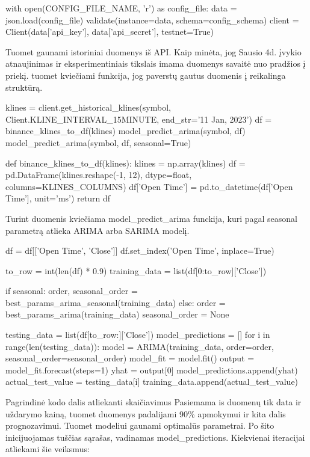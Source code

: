 \documentclass{VUMIFInfKursinis}
\begin{document}
\begin{python}
  with open(CONFIG_FILE_NAME, 'r') as config_file:
  	data = json.load(config_file)
  	validate(instance=data, schema=config_schema)
  	client = Client(data['api_key'], data['api_secret'], testnet=True)
\end{python}

Tuomet gaunami istoriniai duomenys iš API. Kaip minėta, jog Sausio 4d. įvykio atnaujinimas ir eksperimentiniais tikslais imama duomenys savaitė nuo pradžios į priekį.
tuomet kviečiami funkcija, jog paverstų gautus duomenis į reikalinga struktūrą.

\begin{python}
  klines = client.get_historical_klines(symbol, Client.KLINE_INTERVAL_15MINUTE, end_str='11 Jan, 2023')
  df = binance_klines_to_df(klines)
  model_predict_arima(symbol, df)
  model_predict_arima(symbol, df, seasonal=True)

  def binance_klines_to_df(klines):
  	klines = np.array(klines)
  	df = pd.DataFrame(klines.reshape(-1, 12), dtype=float, columns=KLINES_COLUMNS)
  	df['Open Time'] = pd.to_datetime(df['Open Time'], unit='ms')
  	return df
\end{python}

Turint duomenis kviečiama model\_predict\_arima funckija, kuri pagal seasonal parametrą atlieka ARIMA arba SARIMA modelį.

\begin{python}
  df = df[['Open Time', 'Close']]
  df.set_index('Open Time', inplace=True)
  
  to_row = int(len(df) * 0.9)
  training_data = list(df[0:to_row]['Close'])
  
  if seasonal:
  	order, seasonal_order = best_params_arima_seasonal(training_data)
  else:
  	order = best_params_arima(training_data)
  	seasonal_order = None
  
  testing_data = list(df[to_row:]['Close'])
  model_predictions = []
  for i in range(len(testing_data)):
  	model = ARIMA(training_data, order=order, seasonal_order=seasonal_order)
  	model_fit = model.fit()
  	output = model_fit.forecast(steps=1)
  	yhat = output[0]
  	model_predictions.append(yhat)
  	actual_test_value = testing_data[i]
  	training_data.append(actual_test_value)
\end{python}

Pagrindinė kodo dalis atliekanti skaičiavimus
Pasiemama is duomenų tik data ir uždarymo kainą, tuomet duomenys padalijami 90\% apmokymui ir kita dalis prognozavimui. Tuomet modeliui gaunami 
optimalūs parametrai. Po šito inicijuojamas tuščias sąrašas, vadinamas model\_predictions. Kiekvienai iteracijai atliekami šie veiksmus:
\end{document}
